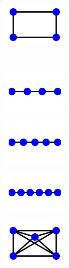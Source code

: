 \begin{figure}
\begin{center}
\begin{subfigure}{2.25cm}
\begin{center}
            \end{center}
            \caption{}
        \end{subfigure}
        \qquad
        \begin{subfigure}{2.25cm} 
            \begin{center}
                \includegraphics{theoretical_study/figures/lattices/_4_site_square.jpg}        
            \end{center}
            \caption{}
        \end{subfigure}
        \\
        \begin{subfigure}{2.25cm} 
            \includegraphics{theoretical_study/figures/lattices/_4_site_chain.jpg}        
            \caption{}
        \end{subfigure}
        \qquad
        \begin{subfigure}{2.25cm} 
            \includegraphics{theoretical_study/figures/lattices/_5_site_chain.jpg}        
            \caption{}
        \end{subfigure}
        \qquad
        \begin{subfigure}{2.25cm} 
            \includegraphics{theoretical_study/figures/lattices/_6_site_chain.jpg}        
            \caption{}
        \end{subfigure}
        \qquad
        \begin{subfigure}{2.25cm} 
            \includegraphics{theoretical_study/figures/lattices/_5_site_lattice_fully_connected.jpg}        

\end{subfigure}
\end{center}
\end{figure}
